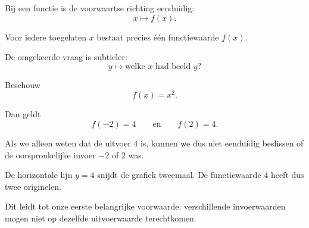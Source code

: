 \documentclass{ximera}
\begin{document}


Bij een functie is de voorwaartse richting eenduidig:
\[
x\longmapsto f(x).
\]

Voor iedere toegelaten \(x\) bestaat precies één functiewaarde \(f(x)\).

De omgekeerde vraag is subtieler:
\[
y\longmapsto \text{welke }x\text{ had beeld }y?
\]

\begin{voorbeeld}

Beschouw
\[
f(x)=x^2.
\]

Dan geldt
\[
f(-2)=4
\qquad\text{en}\qquad
f(2)=4.
\]

Als we alleen weten dat de uitvoer \(4\) is, kunnen we dus niet eenduidig
beslissen of de oorspronkelijke invoer \(-2\) of \(2\) was.

\begin{center}
\end{center}

De horizontale lijn \(y=4\) snijdt de grafiek tweemaal. De functiewaarde
\(4\) heeft dus twee originelen.
\end{voorbeeld}

Dit leidt tot onze eerste belangrijke voorwaarde: verschillende invoerwaarden
mogen niet op dezelfde uitvoerwaarde terechtkomen.


\end{document}
